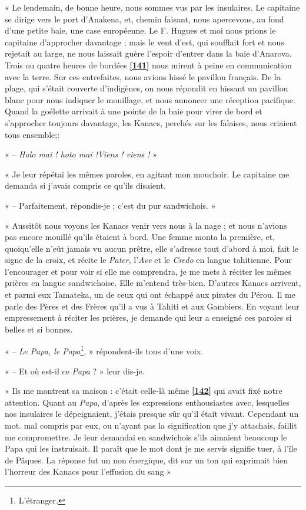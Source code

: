 \documentclass{article}
\begin{document}
        
    « Le lendemain, de bonne heure, nous sommes vus par les insulaires. Le capitaine se dirige vers le port d'Anakena, et, chemin faisant, nous apercevons, au fond d'une petite baie, une case européenne. Le F. Hugues et moi nous prions le capitaine d'approcher davantage ; mais le vent d'est, qui soufflait fort et nous rejetait au large, ne nous laissait guère l'espoir d'entrer dans la baie d'Anarova. Trois ou quatre heures de bordées \href{https://gallica.bnf.fr/iiif/ark:/12148/bpt6k5449280k/f148/full/full/0/native.jpg}{\textbf{[141]}} nous mirent à peine en communication avec la terre. Sur ces entrefaites, nous avions hissé le pavillon français. De la plage, qui s'était couverte d'indigènes, on nous répondit en hissant un pavillon blanc pour nous indiquer le mouillage, et nous annoncer une réception pacifique. Quand la goélette arrivait à une pointe de la baie pour virer de bord et s'approcher toujours davantage, les Kanacs, perchés sur les falaises, nous criaient tous ensemble;:
         
        
    « – \textit{Holo mai ! hoto mai !Viens ! viens !} »
         
        
    « Je leur répétai les mêmes paroles, en agitant mon mouchoir. Le capitaine me demanda si j'avais compris ce qu'ils disaient.
         
        
    « – Parfaitement, répondis-je ; c'est du pur sandwichois. »
         
        
    « Aussitôt nous voyons les Kanacs venir vers nous à la nage ; et nous n'avions pas encore mouillé qu'ils étaient à bord. Une femme monta la première, et, quoiqu'elle n'eût jamais vu aucun prêtre, elle s'adresse tout d'abord à moi, fait le signe de la croix, et récite le \textit{Pater}, l’\textit{Ave} et le \textit{Credo} en langue tahitienne. Pour l'encourager et pour voir si elle me comprendra, je me mets à réciter les mêmes prières en langue sandwichoise. Elle m'entend très-bien. D'autres Kanacs arrivent, et parmi eux Tamateka, un de ceux qui ont échappé aux pirates du Pérou. Il me parle des Pères et des Frères qu'il a vus à Tahiti et aux Gambiers. En voyant leur empressement à réciter les prières, je demande qui leur a enseigné ces paroles si belles et si bonnes.
         
        
    « – \textit{Le Papa, le Papa}\footnote{L'étranger.}, » répondent-ils tous d'une voix.
         
        
    « – Et où est-il ce \textit{Papa} ? » leur dis-je.
         
        
    « Ils me montrent sa maison : c'était celle-là même \href{https://gallica.bnf.fr/iiif/ark:/12148/bpt6k5449280k/f149/full/full/0/native.jpg}{\textbf{[142]}} qui avait fixé notre attention. Quant au \textit{Papa}, d'après les expressions enthousiastes avec, lesquelles nos insulaires le dépeignaient, j'étais presque sûr qu'il était vivant. Cependant un mot. mal compris par eux, ou n'ayant pas la signification que j'y attachais, faillit me compromettre. Je leur demandai en sandwichois s'ils aimaient beaucoup le Papa qui les instruisait. Il paraît que le mot dont je me servis signifie tuer, à l'île de Pâques. La réponse fut un non énergique, dit sur un ton qui exprimait bien l'horreur des Kanacs pour l'effusion du sang »
         
\end{document}
